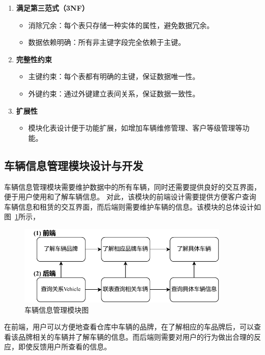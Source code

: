 \documentclass[UTF8,a4paper,12pt]{ctexart}
\begin{document}
\begin{enumerate}
    \item \textbf{满足第三范式（3NF）}
    \begin{itemize}
        \item 消除冗余：每个表只存储一种实体的属性，避免数据冗余。
        \item 数据依赖明确：所有非主键字段完全依赖于主键。
    \end{itemize}
    \item \textbf{完整性约束}
    \begin{itemize}
        \item 主键约束：每个表都有明确的主键，保证数据唯一性。
        \item 外键约束：通过外键建立表间关系，保证数据一致性。
    \end{itemize}
    \item \textbf{扩展性}
    \begin{itemize}
        \item 模块化表设计便于功能扩展，如增加车辆维修管理、客户等级管理等功能。
    \end{itemize}
\end{enumerate}


\subsection{车辆信息管理模块设计与开发}
车辆信息管理模块需要维护数据中的所有车辆，同时还需要提供良好的交互界面，便于用户使用和了解车辆信息。
对此，该模块的前端设计需要提供方便客户查询车辆信息和租赁的交互界面，而后端则需要维护车辆的信息。该模块的总体设计如图~\ref{fig:carman}所示，
\begin{figure}[htbp]  %
    \centering  %
    \includegraphics[width=0.9\textwidth]{pic/carman.pdf}
    \caption{车辆信息管理模块图}  %
    \label{fig:carman}  %
\end{figure}
在前端，用户可以方便地查看仓库中车辆的品牌，在了解相应的车品牌后，可以查看该品牌相关的车辆并了解车辆的信息。而后端则需要对用户的行为做出合理的反应，即使反馈用户所查看的信息。
\end{document}
